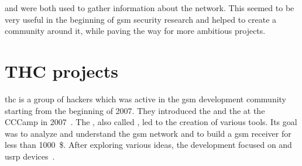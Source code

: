        and  were both used to
      gather information about the network. This seemed to be very
      useful in the beginning of \gls{gsm} security research and helped
      to create a community around it, while paving the way for more
      ambitious projects.

    \section{THC projects}

      \gls{thc} is a group of hackers which was active in the \gls{gsm}
      development community starting from the beginning of 2007. They
      introduced the  and the  at the CCCamp in 2007~\cite{hulton_a5_2007}. The
      , also called , led to the creation of various tools. Its goal
      was to analyze and understand the \gls{gsm} network and to build a
      \gls{gsm} receiver for less than \SI{1000}{\$}. After exploring
      various ideas, the development focused on  and
      \gls{usrp} devices~\cite{gsm_2009}.

